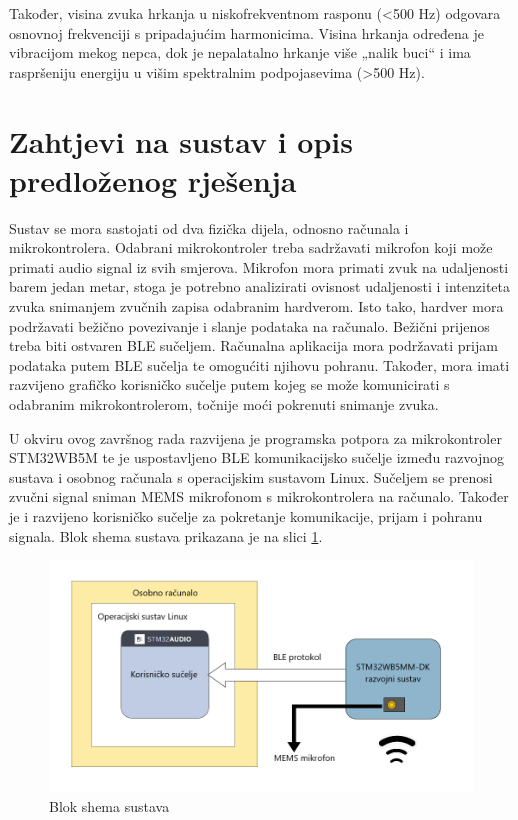 Također, visina zvuka hrkanja u niskofrekventnom rasponu (<500 Hz) odgovara osnovnoj frekvenciji s pripadajućim harmonicima. Visina hrkanja određena je vibracijom mekog nepca, dok je nepalatalno hrkanje više „nalik buci“ i ima raspršeniju energiju u višim spektralnim podpojasevima (>500 Hz).


\section{Zahtjevi na sustav i opis predloženog rješenja}

Sustav se mora sastojati od dva fizička dijela, odnosno računala i mikrokontrolera. Odabrani mikrokontroler treba sadržavati mikrofon koji može primati audio signal iz svih smjerova. Mikrofon mora primati zvuk na udaljenosti barem jedan metar, stoga je potrebno analizirati ovisnost udaljenosti i intenziteta zvuka snimanjem zvučnih zapisa odabranim hardverom. Isto tako, hardver mora podržavati bežično povezivanje i slanje podataka na računalo. Bežični prijenos treba biti ostvaren BLE sučeljem. Računalna aplikacija mora podržavati prijam podataka putem BLE sučelja te omogućiti njihovu pohranu. Također, mora imati razvijeno grafičko korisničko sučelje putem kojeg se može komunicirati s odabranim mikrokontrolerom, točnije moći pokrenuti snimanje zvuka.

U okviru ovog završnog rada razvijena je programska potpora za mikrokontroler \newline STM32WB5M te je uspostavljeno BLE komunikacijsko sučelje između razvojnog sustava i osobnog računala s operacijskim sustavom Linux. Sučeljem se prenosi zvučni signal sniman MEMS mikrofonom s mikrokontrolera na računalo. Također je i razvijeno korisničko sučelje za pokretanje komunikacije, prijam i pohranu signala. Blok shema sustava prikazana je na slici \ref{fig:shema}. 

\begin{figure}[ht]
	\includegraphics[width=\linewidth]{imgs/shema}
	\caption{Blok shema sustava}
	\label{fig:shema}
\end{figure}

